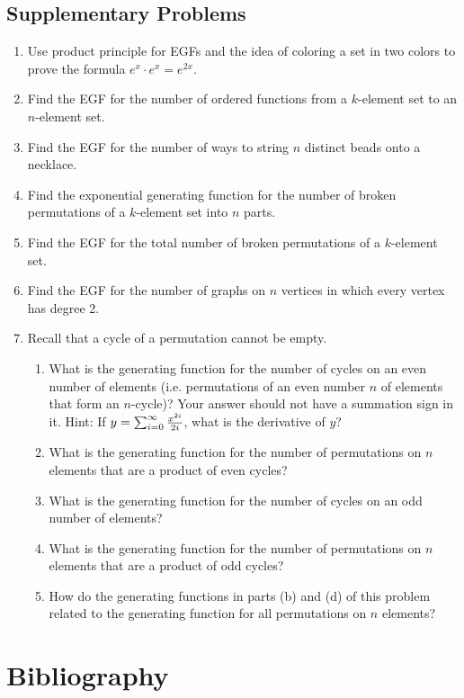 \documentclass[10pt,]{book}
\theoremstyle{plain}
\theoremstyle{definition}
\numberwithin{equation}{chapter}
\begin{document}
\section[{Supplementary Problems}]{Supplementary Problems}\label{section-11}
\leavevmode%
\begin{enumerate}
\item\hypertarget{li-31}{}Use product principle for EGFs and the idea of coloring a set in two colors to prove the formula \(e^x\cdot e^x = e^{2x}.\)%
\item\hypertarget{li-32}{}Find the EGF for the number of ordered functions from a \(k\)-element set to an \(n\)-element set.%
\item\hypertarget{li-33}{}Find the EGF for the number of ways to string \(n\) distinct beads onto a necklace.%
\item\hypertarget{li-34}{}Find the exponential generating function for the number of broken permutations of a \(k\)-element set into \(n\) parts.%
\item\hypertarget{li-35}{}Find the EGF for the total number of broken permutations of a \(k\)-element set.%
\item\hypertarget{li-36}{}Find the EGF for the number of graphs on \(n\) vertices in which every vertex has degree 2.%
\item\hypertarget{li-37}{}Recall that a cycle of a permutation cannot be empty. %
\begin{enumerate}
\item\hypertarget{li-38}{}What is the generating function for the number of cycles on an even number of elements (i.e. permutations of an even number \(n\) of elements that form an \(n\)-cycle)?  Your answer should not have a summation sign in it.  Hint: If \(y=
\sum_{i=0}^\infty {x^{2i}\over 2i}\), what is the derivative of \(y\)?%
\item\hypertarget{li-39}{}What is the generating function for the number of permutations on \(n\) elements that are a product of even cycles?%
\item\hypertarget{li-40}{}What is the generating function for the number of cycles on an odd number of elements?%
\item\hypertarget{li-41}{}What is the generating function for the number of permutations on \(n\) elements that are a product of odd cycles?%
\item\hypertarget{li-42}{}How do the generating functions in parts (b) and (d) of this problem related to the generating function for all permutations on \(n\) elements?%
\end{enumerate}
%
\end{enumerate}
\typeout{************************************************}
\typeout{************************************************}
\chapter[{Bibliography}]{Bibliography}\label{references-1}
%
\renewcommand{\leftmark}{Index}
\printindex
%
\end{document}
